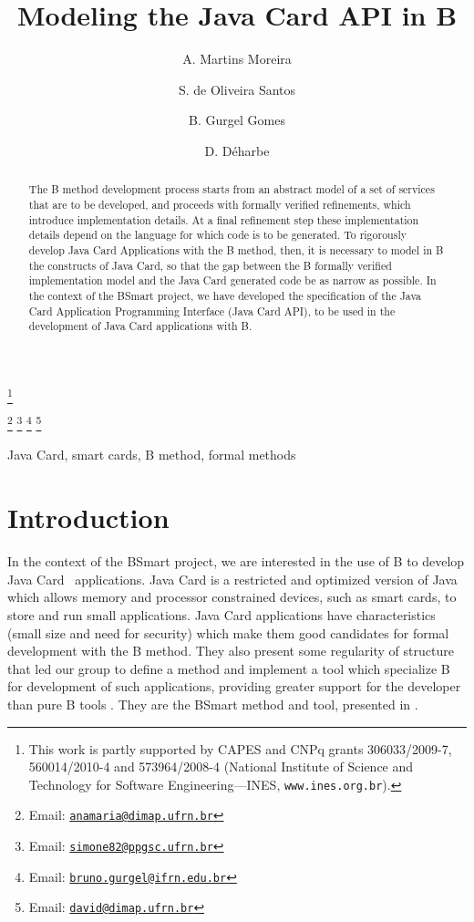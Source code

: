 \documentclass{entcs}
\begin{document}
\begin{frontmatter}

  \title{Modeling the Java Card API in B}
  \author[ufrn]{A. Martins Moreira}
  \author[ufrn]{S. de Oliveira Santos }
  \author[ifrn]{B. Gurgel Gomes } \author[ufrn]{D.
    D\'{e}harbe } \address[ufrn]{DIMAp-UFRN, Natal,
    RN, Brazil} \thanks[ALL]{This work is partly supported by CAPES
    and CNPq grants 306033/2009-7, 560014/2010-4 and 573964/2008-4
    (National Institute of Science and Technology for Software
    Engineering---INES, \texttt{www.ines.org.br}).}
\address[ifrn]{IFRN, Currais Novos, RN, Brazil}
\thanks[anamaria]{Email: \href{mailto:anamaria@dimap.ufrn.br}
  {\texttt{\normalshape anamaria@dimap.ufrn.br}}}
\thanks[simone]{Email: \href{mailto:simone82@ppgsc.ufrn.br}
  {\texttt{\normalshape simone82@ppgsc.ufrn.br}}}
\thanks[bruno]{Email: \href{mailto:bruno.gurgel@ifrn.edu.br}
  {\texttt{\normalshape bruno.gurgel@ifrn.edu.br}}}
\thanks[david]{Email: \href{mailto:david@dimap.ufrn.br}
  {\texttt{\normalshape david@dimap.ufrn.br}}}


\begin{abstract} 
  The B method development process starts from an abstract model of a
  set of services that are to be developed, and proceeds with formally
  verified refinements, which introduce implementation details. At a
  final refinement step these implementation details depend on the
  language for which code is to be generated. To rigorously develop
  Java Card Applications with the B method, then, it is necessary to
  model in B the constructs of Java Card, so that the gap between the
  B formally verified implementation model and the Java Card generated
  code be as narrow as possible. In the context of the BSmart project,
  we have developed the specification of the Java Card Application
  Programming Interface (Java Card API), to be used in the development
  of Java Card applications with B.
\end{abstract}
\begin{keyword}
  Java Card, smart cards, B method, formal methods
\end{keyword}
\end{frontmatter}
\section{Introduction}\label{intro}

In the context of the BSmart project, we are interested in the use of
B to develop Java Card~\cite{chen:2000} applications.  Java Card is a
restricted and optimized version of Java which allows memory and
processor constrained devices, such as smart cards, to store and run
small applications.  Java Card applications have characteristics
(small size and need for security) which make them good candidates for
formal development with the B method. They also present some
regularity of structure that led our group to define a method and
implement a tool which specialize B for development of such
applications, providing greater support for the developer than pure B
tools \cite{atelierB,proB}. They are the BSmart method and tool,
presented in \cite{BSmart08,Gomes10}.
\end{document}
